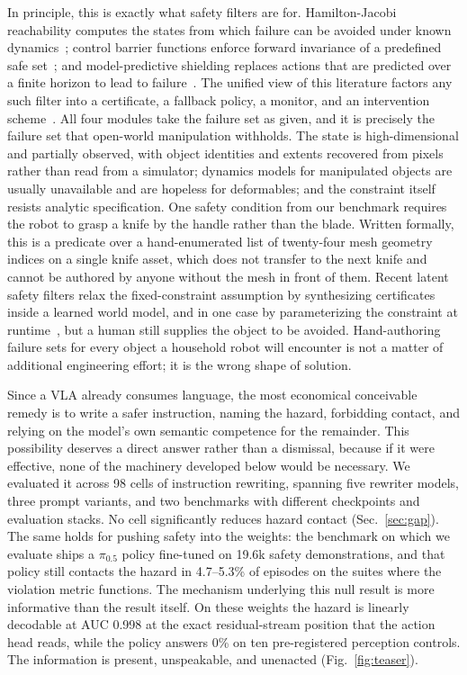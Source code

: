 \documentclass[conference]{IEEEtran}
\begin{document}
In principle, this is exactly what safety filters are for. Hamilton-Jacobi reachability computes the states from which failure can be avoided under known dynamics~\cite{mitchell2005hj}; control barrier functions enforce forward invariance of a predefined safe set~\cite{ames2017cbf,ames2019cbf}; and model-predictive shielding replaces actions that are predicted over a finite horizon to lead to failure~\cite{bastani2021shielding}. The unified view of this literature factors any such filter into a certificate, a fallback policy, a monitor, and an intervention scheme~\cite{hsu2024safetyfilter}. All four modules take the failure set as given, and it is precisely the failure set that open-world manipulation withholds. The state is high-dimensional and partially observed, with object identities and extents recovered from pixels rather than read from a simulator; dynamics models for manipulated objects are usually unavailable and are hopeless for deformables; and the constraint itself resists analytic specification. One safety condition from our benchmark requires the robot to grasp a knife by the handle rather than the blade. Written formally, this is a predicate over a hand-enumerated list of twenty-four mesh geometry indices on a single knife asset, which does not transfer to the next knife and cannot be authored by anyone without the mesh in front of them. Recent latent safety filters relax the fixed-constraint assumption by synthesizing certificates inside a learned world model, and in one case by parameterizing the constraint at runtime~\cite{nakamura2025latent,anysafe}, but a human still supplies the object to be avoided. Hand-authoring failure sets for every object a household robot will encounter is not a matter of additional engineering effort; it is the wrong shape of solution.

Since a VLA already consumes language, the most economical conceivable remedy is to write a safer instruction, naming the hazard, forbidding contact, and relying on the model's own semantic competence for the remainder. This possibility deserves a direct answer rather than a dismissal, because if it were effective, none of the machinery developed below would be necessary. We evaluated it across 98 cells of instruction rewriting, spanning five rewriter models, three prompt variants, and two benchmarks with different checkpoints and evaluation stacks. No cell significantly reduces hazard contact (Sec.~\ref{sec:gap}). The same holds for pushing safety into the weights: the benchmark on which we evaluate ships a $\pi_{0.5}$ policy fine-tuned on 19.6k safety demonstrations, and that policy still contacts the hazard in 4.7--5.3\% of episodes on the suites where the violation metric functions. The mechanism underlying this null result is more informative than the result itself. On these weights the hazard is linearly decodable at AUC 0.998 at the exact residual-stream position that the action head reads, while the policy answers 0\% on ten pre-registered perception controls. The information is present, unspeakable, and unenacted (Fig.~\ref{fig:teaser}).
\end{document}
